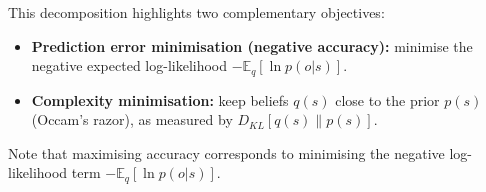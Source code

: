 \documentclass[a4paper, twoside]{article}
\DeclareMathOperator*{\argmin}{arg\,min}
\begin{document}
This decomposition highlights two complementary objectives:
\begin{itemize}
    \item \textbf{Prediction error minimisation (negative accuracy):} minimise the negative expected log-likelihood
    $-\mathbb{E}_q[\ln p(o|s)]$.
    \item \textbf{Complexity minimisation:} keep beliefs $q(s)$ close to the prior $p(s)$ (Occam's razor),
    as measured by $D_{KL}[q(s)\|p(s)]$.
\end{itemize}

Note that maximising accuracy corresponds to minimising the negative log-likelihood term $-\mathbb{E}_q[\ln p(o|s)]$.




\end{document}
